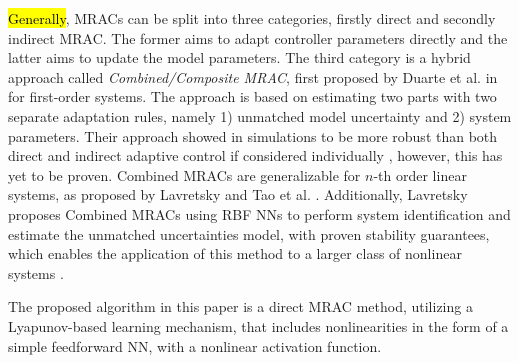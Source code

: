 \hl{Generally}, MRACs can be split into three categories, firstly direct and secondly indirect MRAC. The former aims to adapt controller parameters directly and the latter aims to update the model parameters. The third category is a hybrid approach called \textit{Combined/Composite MRAC}, first proposed by Duarte et al. in \cite{duarteCombinedDirectIndirect1989} for first-order systems. The approach is based on estimating two parts with two separate adaptation rules, namely 1) unmatched model uncertainty and 2) system parameters. Their approach showed in simulations to be more robust than both direct and indirect adaptive control if considered individually \cite{narendraRobustAdaptiveControl1988}, however, this has yet to be proven. Combined MRACs are generalizable for $n$-th order linear systems, as proposed by Lavretsky \cite{lavretskyRobustAdaptiveControl2013} and Tao et al. \cite{taoAdaptiveControlSystems2013}. Additionally, Lavretsky proposes Combined MRACs using RBF NNs to perform system identification and estimate the unmatched uncertainties model, with proven stability guarantees, which enables the application of this method to a larger class of nonlinear systems \cite{lavretskyCombinedCompositeModel2009}.

The proposed algorithm in this paper is a direct MRAC method, utilizing a Lyapunov-based learning mechanism, that includes nonlinearities in the form of a simple feedforward NN, with a nonlinear activation function.



